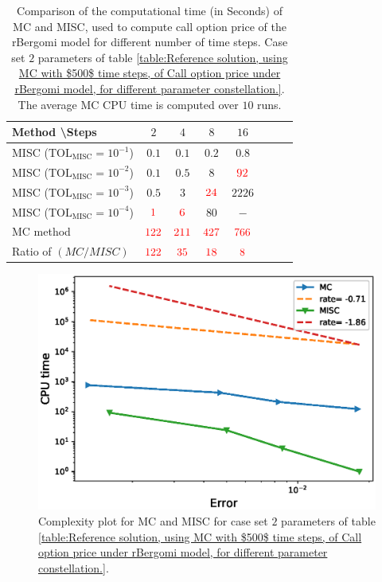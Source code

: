 \FloatBarrier
\begin{table}[h!]
	\centering
	\begin{tabular}{l*{6}{c}r}
		Method \textbackslash  Steps            & $2$ & $4$ & $8$ & $16$ &   \\
		\hline
		MISC ($\text{TOL}_{\text{MISC}}=10^{-1}$)  & $0.1$ & $0.1$ & $0.2$ & $0.8$ \\
		MISC ($\text{TOL}_{\text{MISC}}=10^{-2}$)  & $0.1$ & $0.5$ & $8$ & $\red{92}$ \\
		MISC ($\text{TOL}_{\text{MISC}}=10^{-3}$)  & $0.5$ & $3$ & $\red{24}$ & $2226$ \\
		MISC ($\text{TOL}_{\text{MISC}}=10^{-4}$)  & $\red{1}$ & $\red{6}$ & $80$ & $-$\\
		\hline
		MC method   & $ \red{122}
		
		$  & $  \red{211}$  & $  \red{427}$ & $ \red{766}
		$  \\	
		\hline
		Ratio of $\left(MC/MISC \right)$ & $ \red{122}
		
		$  & $  \red{35}$  & $  \red{  18
		}$ & $ \red{ 8}
		$  \\	
		
		\hline
	\end{tabular}
	\caption{Comparison of the computational time (in Seconds) of  MC and MISC, used to compute call option price of the rBergomi model for different number of time steps. Case set $2$ parameters of table \ref{table:Reference solution, using MC with $500$ time steps, of Call option price under rBergomi model, for different parameter constellation.}. The average  MC CPU time is computed over $10$ runs. }
	\label{Comparsion of the computational time of  MC and MISC, used to compute Call option price of rBergomi model for different number of time steps. Case set3}
\end{table}
\FloatBarrier
	\begin{figure}[h!]
	\centering
	\includegraphics[width=0.35\linewidth]{./figures/rBergomi_Complexity_rates/set5/error_vs_time_set5}

	\caption{Complexity plot for   MC and MISC for case set $2$ parameters of table \ref{table:Reference solution, using MC with $500$ time steps, of Call option price under rBergomi model, for different parameter constellation.}.}
	\label{fig:Complexity plot for MC and MISC for Case set $3$ parameters}
\end{figure}



